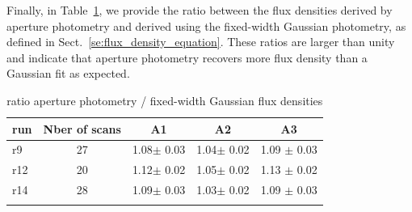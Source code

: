 



Finally, in Table~\ref{tab:ratio}, we provide the ratio between the
flux densities derived by aperture photometry
and derived using the fixed-width Gaussian photometry, as defined in
Sect.~\ref{se:flux_density_equation}.
These ratios are larger than unity and indicate that aperture
photometry recovers more flux density than a Gaussian fit as
expected.




\begin{table}[!h]
\caption{ratio aperture photometry / fixed-width Gaussian flux densities   }
\label{tab:ratio}
\centering
\begin{tabular}{l| c | c c c }
\hline\hline
\noalign{\smallskip}
run     & Nber of scans  &  A1    &    A2   &  A3    \\
\hline
r9    & 27  &  1.08$\pm$ 0.03    &  1.04$\pm$ 0.02 & 1.09 $\pm$ 0.03     \\
r12   & 20  &  1.12$\pm$ 0.02    &  1.05$\pm$ 0.02 & 1.13 $\pm$ 0.02     \\
r14   & 28  &  1.09$\pm$ 0.03    &  1.03$\pm$ 0.02 & 1.09 $\pm$ 0.03     \\
\noalign{\smallskip}
\hline
\end{tabular}
\end{table}

